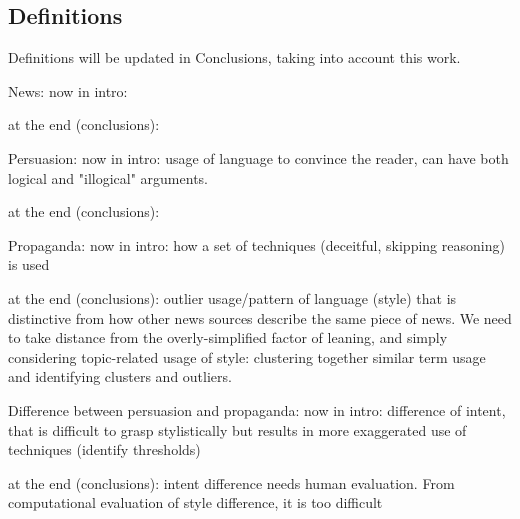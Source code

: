 









\subsection{Definitions}
Definitions will be updated in Conclusions, taking into account this work.

News:
now in intro:

at the end (conclusions):

Persuasion:
now in intro: usage of language to convince the reader, can have both logical and "illogical" arguments.

at the end (conclusions):


Propaganda:
now in intro: how a set of techniques (deceitful, skipping reasoning) is used 

at the end (conclusions): outlier usage/pattern of language (style) that is distinctive from how other news sources describe the same piece of news. We need to take distance from the overly-simplified factor of leaning, and simply considering topic-related usage of style: clustering together similar term usage and identifying clusters and outliers.

Difference between persuasion and propaganda:
now in intro: difference of intent, that is difficult to grasp stylistically but results in more exaggerated use of techniques (identify thresholds)

at the end (conclusions): intent difference needs human evaluation. From computational evaluation of style difference, it is too difficult


